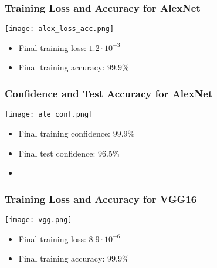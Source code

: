 \documentclass[../presentation.tex]{subfiles} %
\begin{document}
\begin{frame}
    \frametitle{Training Loss and Accuracy for AlexNet}
    \begin{center}
        \texttt{[image: alex\_loss\_acc.png]}
    \end{center}

    \small{
    \begin{cbox}
        \begin{itemize}
            \item Final training loss: $1.2\cdot 10^{-3}$
            \item Final training accuracy: $99.9\%$
        \end{itemize}
    \end{cbox}
    }
\end{frame}

\begin{frame}
    \frametitle{Confidence and Test Accuracy for AlexNet}
    \begin{center}
        \texttt{[image: ale\_conf.png]}
    \end{center}

    \small{
    \begin{cbox}
        \begin{itemize}
            \item Final training confidence: $99.9\%$
            \item Final test confidence: $96.5\%$
            \item {}
        \end{itemize}
    \end{cbox}
    }
\end{frame}

\begin{frame}
    \frametitle{Training Loss and Accuracy for VGG16}
    \begin{center}
        \texttt{[image: vgg.png]}
    \end{center}

    \small{
    \begin{cbox}
        \begin{itemize}
            \item Final training loss: $8.9\cdot 10^{-6}$
            \item Final training accuracy: $99.9\%$
        \end{itemize}
    \end{cbox}
    }
\end{frame}
\end{document}
